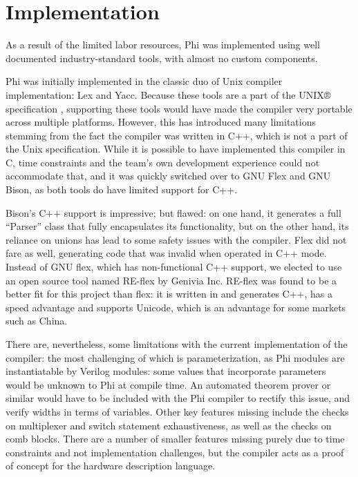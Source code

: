 \documentclass[10pt, two column]{article}
\theoremstyle{definition}
\begin{document}
\section{Implementation}

As a result of the limited labor resources, Phi was implemented using well documented industry-standard tools, with almost no custom components.\par

Phi was initially implemented in the classic duo of Unix compiler implementation: Lex and Yacc. Because these tools are a part of the UNIX® specification \cite{openGroupBaseSpecif_2018}, supporting these tools would have made the compiler very portable across multiple platforms. However, this has introduced many limitations stemming from the fact the compiler was written in C++, which is not a part of the Unix specification. While it is possible to have implemented this compiler in C, time constraints and the team’s own development experience could not accommodate that, and it was quickly switched over to GNU Flex and GNU Bison, as both tools do have limited support for C++.\par

Bison’s C++ support is impressive; but flawed: on one hand, it generates a full “Parser” class that fully encapsulates its functionality, but on the other hand, its reliance on unions has lead to some safety issues with the compiler. Flex did not fare as well, generating code that was invalid when operated in C++ mode. Instead of GNU flex, which has non-functional C++ support, we elected to use an open source tool named RE-flex by Genivia Inc\cite{reflex}. RE-flex was found to be a better fit for this project than flex: it is written in and generates C++, has a speed advantage and supports Unicode, which is an advantage for some markets such as China.\par

There are, nevertheless, some limitations with the current implementation of the compiler: the most challenging of which is parameterization, as Phi modules are instantiatable by Verilog modules: some values that incorporate parameters would be unknown to Phi at compile time. An automated theorem prover or similar would have to be included with the Phi compiler to rectify this issue, and verify widths in terms of variables. Other key features missing include the checks on multiplexer and switch statement exhaustiveness, as well as the checks on comb blocks. There are a number of smaller features missing purely due to time constraints and not implementation challenges, but the compiler acts as a proof of concept for the hardware description language.\par
\end{document}
